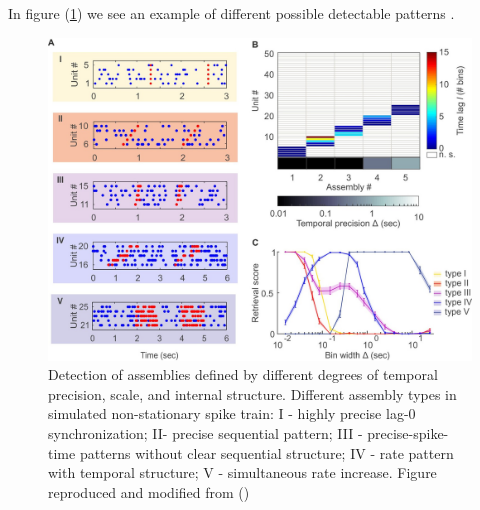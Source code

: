 \documentclass{article}
\begin{document}
In figure (\ref{fig: AsEx}) we see an example of different possible detectable patterns . 
\begin{figure}[!ht]
  \begin{center}
    \includegraphics[width=1\textwidth]{AsEx1}
  \end{center}
\caption{\footnotesize{Detection of assemblies defined by different degrees of temporal precision, scale, and internal structure. Different assembly types in simulated non-stationary spike train: I - highly precise lag-0 synchronization; II- precise sequential pattern; III - precise-spike-time patterns without clear sequential structure; IV - rate pattern with temporal structure; V - simultaneous rate increase. Figure reproduced and modified from (\cite{RussoDurstewitz})}}
\label{fig: AsEx}
\end{figure}
\end{document}
